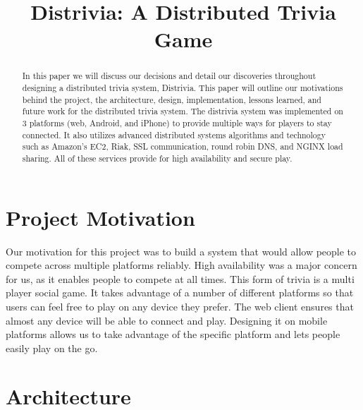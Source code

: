 \documentclass{dependencies/acm_proc_article-sp}
\begin{document}
\title{ Distrivia: A Distributed Trivia Game }
\maketitle

\begin{abstract}
In this paper we will discuss our decisions and detail our discoveries throughout designing a distributed trivia system, Distrivia.
This paper will outline our motivations behind the project, the architecture, design, implementation, lessons learned, and future work for the distributed trivia system.
The distrivia system was implemented on 3 platforms (web, Android, and iPhone) to provide multiple ways for players to stay connected.
It also utilizes advanced distributed systems algorithms and technology such as Amazon's EC2, Riak, SSL communication, round robin DNS, and NGINX load sharing.
All of these services provide for high availability and secure play.
\end{abstract}

\section{Project Motivation}
Our motivation for this project was to build a system that would allow people to compete across multiple platforms reliably.
High availability was a major concern for us, as it enables people to compete at all times.
This form of trivia is a multi player social game.
It takes advantage of a number of different platforms so that users can feel free to play on any device they prefer.
The web client ensures that almost any device will be able to connect and play.
Designing it on mobile platforms allows us to take advantage of the specific platform and lets people easily play on the go.

\section{Architecture}
\end{document}
